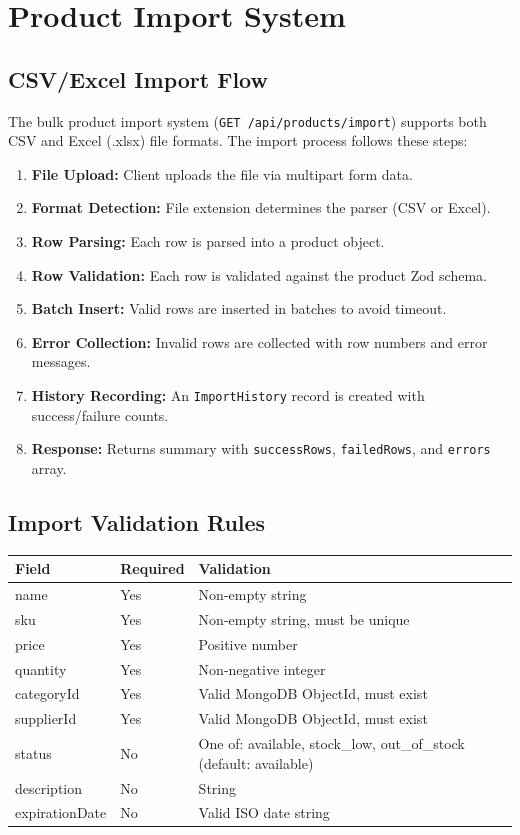 \documentclass[12pt,a4paper]{report}
\begin{document}
\section{Product Import System}

\subsection{CSV/Excel Import Flow}

The bulk product import system (\texttt{GET /api/products/import}) supports both CSV and Excel (.xlsx) file formats. The import process follows these steps:

\begin{enumerate}[leftmargin=1.5em]
  \item \textbf{File Upload:} Client uploads the file via multipart form data.
  \item \textbf{Format Detection:} File extension determines the parser (CSV or Excel).
  \item \textbf{Row Parsing:} Each row is parsed into a product object.
  \item \textbf{Row Validation:} Each row is validated against the product Zod schema.
  \item \textbf{Batch Insert:} Valid rows are inserted in batches to avoid timeout.
  \item \textbf{Error Collection:} Invalid rows are collected with row numbers and error messages.
  \item \textbf{History Recording:} An \texttt{ImportHistory} record is created with success/failure counts.
  \item \textbf{Response:} Returns summary with \texttt{successRows}, \texttt{failedRows}, and \texttt{errors} array.
\end{enumerate}

\subsection{Import Validation Rules}

\begin{center}
\begin{tabularx}{\textwidth}{llX}
  \toprule
  \textbf{Field} & \textbf{Required} & \textbf{Validation} \\
  \midrule
  name       & Yes & Non-empty string \\
  sku        & Yes & Non-empty string, must be unique \\
  price      & Yes & Positive number \\
  quantity   & Yes & Non-negative integer \\
  categoryId & Yes & Valid MongoDB ObjectId, must exist \\
  supplierId & Yes & Valid MongoDB ObjectId, must exist \\
  status     & No  & One of: available, stock\_low, out\_of\_stock (default: available) \\
  description & No & String \\
  expirationDate & No & Valid ISO date string \\
  \bottomrule
\end{tabularx}
\end{center}
\end{document}
